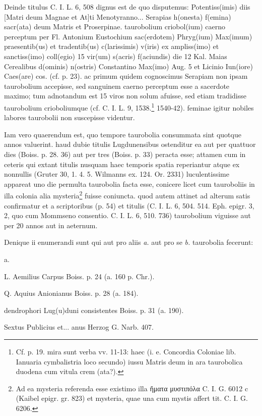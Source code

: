 \documentclass[a4paper, 11pt, oneside, polutonikogreek, german]{article}
\begin{document}
Deinde titulus C. I. L. 6, 508 dignus est de quo disputemus: Potentiss(imis) diis [Matri deum Magnae et At]ti Menotyranno... Serapias h(onesta) f(emina) sacr(ata) deum Matris et Proserpinae. taurobolium criobol(ium) caerno perceptum per Fl. Antonium Eustochium sac(erdotem) Phryg(ium) Max(imum) praesentib(us) et tradentib(us) c(larissimis) v(iris) ex ampliss(imo) et sanctiss(imo) coll(egio) 15 vir(um) s(acris) f(aciundis) die 12 Kal. Maias Cerealibus d(ominis) n(ostris) Constantino Max(imo) Aug. 5 et Licinio Iun(iore) Caes(are) cos. (cf. p. 23). ac primum quidem cognoscimus Serapiam non ipsam taurobolium accepisse, sed sanguinem caerno perceptum esse a sacerdote maximo; tum adnotandum est 15 viros non solum afuisse, sed etiam tradidisse taurobolium crioboliumque (cf. C. I. L. 9, 1538.\footnote{Cf. p. 19. mira sunt verba vv. 11-13: haec (i. e. Concordia Coloniae lib. Ianuaria cymbalistria loco secundo) iussu Matris deum in ara taurobolica duodena cum vitula crem (ata?).} 1540-42). feminae igitur nobiles labores taurobolii non suscepisse videntur.

Iam vero quaerendum est, quo tempore taurobolia consummata sint quotque annos valuerint. haud dubie titulis Lugdunensibus ostenditur ea aut per quattuor dies (Boiss. p. 28. 36) aut per tres (Boiss. p. 33) peracta esse; attamen cum in ceteris qui extant titulis nusquam haec temporis spatia reperiantur atque ex nonnullis (Gruter 30, 1. 4. 5. Wilmanns ex. 124. Or. 2331) luculentissime appareat uno die permulta taurobolia facta esse, conicere licet cum tauroboliis in illa colonia alia mysteria\footnote{Ad ea mysteria referenda esse existimo illa ἤματα μυστιπόλα C. I. G. 6012 c (Kaibel epigr. gr. 823) et mysteria, quae una cum mystis affert tit. C. I. G. 6206.} fuisse coniuncta. quod autem attinet ad alterum satis confirmatur et a scriptoribus (p. 54) et titulis (C. I. L. 6, 504. 514. Eph. epigr. 3, 2, quo cum Mommseno consentio. C. I. L. 6, 510. 736) taurobolium viguisse aut per 20 annos aut in aeternum.

Denique ii enumerandi sunt qui aut pro aliis \emph{a.} aut pro se \emph{b.} taurobolia fecerunt:

a.

L. Aemilius Carpus Boiss. p. 24 (a. 160 p. Chr.).

Q. Aquius Anionianus Boiss. p. 28 (a. 184).

dendrophori Lug(u)duni consistentes Boiss. p. 31 (a. 190).

Sextus Publicius et... anus Herzog G. Narb. 407.
\end{document}
